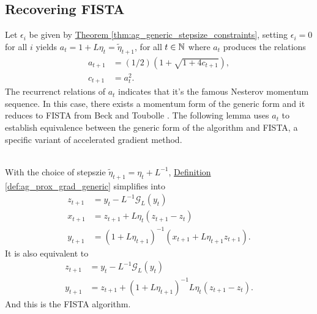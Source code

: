 \documentclass[12pt]{article}
\begin{document}
    \subsection{Recovering FISTA} 
        Let $\epsilon_i$ be given by
        \hyperref[thm:ag_generic_stepsize_constraints]
        {Theorem \ref*{thm:ag_generic_stepsize_constraints}}, 
        setting $\epsilon_i = 0$ for all $i$ yields $a_t = 1 + L\eta_t = \tilde \eta_{t + 1}$, for all $t \in \mathbb N$ where $a_t$ produces the relations 
        \begin{align*}
            a_{t + 1} &= (1/2)\left(
                1 + \sqrt{1 + 4 c_{t + 1}}
            \right), 
            \\
            c_{t + 1} &= a_t^2. 
        \end{align*}
        The recurrenct relations of $a_t$ indicates that it's the famous Nesterov momentum sequence. 
        In this case, there exists a momentum form of the generic form and it reduces to FISTA from Beck and Toubolle \cite{beck_fast_2009-1}. 
        The following lemma uses $a_t$ to establish equivalence between the generic form of the algorithm and FISTA, a specific variant of accelerated gradient method. 
        \begin{lemma}
            \quad \\
            With the choice of stepszie $\tilde \eta_{t + 1} = \eta_t + L^{-1}$,
            \hyperref[def:ag_prox_grad_generic]
            {Definition \ref*{def:ag_prox_grad_generic}}
            simplifies into 
            \begin{align*}
                z_{t + 1} &= y_t - L^{-1} \mathcal G_L(y_t)
                \\
                x_{t + 1} &= z_{t + 1} + L\eta_t (z_{t + 1} - z_t)
                \\
                y_{t + 1} &= 
                (1 + L\eta_{t + 1})^{-1}
                (
                x_{t + 1} + L\eta_{t + 1}z_{t + 1}
                ). 
            \end{align*}
            It is also equivalent to 
            \begin{align*}
                z_{t + 1} &= y_t - L^{-1}\mathcal G_L(y_t)
                \\
                y_{t + 1} &= z_{t + 1} + (1 + L\eta_{t + 1})^{-1}L\eta_t (z_{t + 1} - z_t). 
            \end{align*}
            And this is the FISTA algorithm. 
        \end{lemma}
\end{document}
